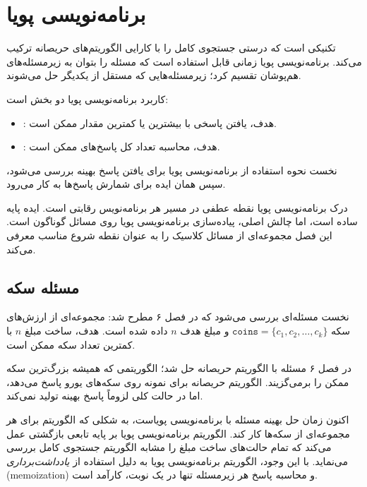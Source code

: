 \chapter{برنامه‌نویسی پویا}


تکنیکی است که درستی جستجوی کامل را با کارایی الگوریتم‌های حریصانه ترکیب می‌کند.
برنامه‌نویسی پویا زمانی قابل استفاده است که مسئله را بتوان به زیرمسئله‌های هم‌پوشان تقسیم کرد؛ زیرمسئله‌هایی که مستقل از یکدیگر حل می‌شوند.

کاربرد برنامه‌نویسی پویا دو بخش است:

\begin{itemize}
\item
{}:
هدف، یافتن پاسخی با بیشترین یا کمترین مقدار ممکن است.
\item
{}:
هدف، محاسبه تعداد کل پاسخ‌های ممکن است.
\end{itemize}

نخست نحوه استفاده از برنامه‌نویسی پویا برای یافتن پاسخ بهینه بررسی می‌شود، سپس همان ایده برای شمارش پاسخ‌ها به کار می‌رود.

درک برنامه‌نویسی پویا نقطه عطفی در مسیر هر برنامه‌نویس رقابتی است.
ایده پایه ساده است، اما چالش اصلی، پیاده‌سازی برنامه‌نویسی پویا روی مسائل گوناگون است.
این فصل مجموعه‌ای از مسائل کلاسیک را به عنوان نقطه شروع مناسب معرفی می‌کند.

\section{مسئله سکه}

نخست مسئله‌ای بررسی می‌شود که در فصل ۶ مطرح شد:
مجموعه‌ای از ارزش‌های سکه $\texttt{coins} = \{c_1,c_2,\ldots,c_k\}$ و مبلغ هدف $n$ داده شده است. هدف، ساخت مبلغ $n$ با کمترین تعداد سکه ممکن است.

در فصل ۶ مسئله با الگوریتم حریصانه حل شد؛ الگوریتمی که همیشه بزرگ‌ترین سکه ممکن را برمی‌گزیند.
الگوریتم حریصانه برای نمونه روی سکه‌های یورو پاسخ می‌دهد، اما در حالت کلی لزوماً پاسخ بهینه تولید نمی‌کند.

اکنون زمان حل بهینه مسئله با برنامه‌نویسی پویاست، به شکلی که الگوریتم برای هر مجموعه‌ای از سکه‌ها کار کند.
الگوریتم برنامه‌نویسی پویا بر پایه تابعی بازگشتی عمل می‌کند که تمام حالت‌های ساخت مبلغ را مشابه الگوریتم جستجوی کامل بررسی می‌نماید.
با این وجود، الگوریتم برنامه‌نویسی پویا به دلیل استفاده از \emph{یادداشت‌برداری} (memoization) و محاسبه پاسخ هر زیرمسئله تنها در یک نوبت، کارآمد است.

